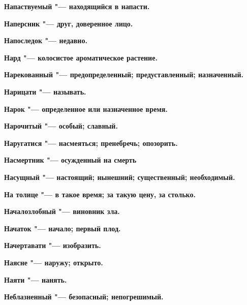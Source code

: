 \begin{mymulticols}{2}
\bfseries Напаствуемый\normalfont{} "--- находящийся в напасти. 




\bfseries Наперсник\normalfont{} "--- друг, доверенное лицо. 




\bfseries Напоследок\normalfont{} "--- недавно. 




\bfseries Нард\normalfont{} "--- колосистое ароматическое растение. 




\bfseries Нарекованный\normalfont{} "--- предопределенный; предуставленный; назначенный. 




\bfseries Нарицати\normalfont{} "--- называть. 




\bfseries Нарок\normalfont{} "--- определенное или назначенное время. 




\bfseries Нарочитый\normalfont{} "--- особый; славный. 




\bfseries Наругатися\normalfont{} "--- насмеяться; пренебречь; опозорить. 




\bfseries Насмертник\normalfont{} "--- осужденный на смерть 




\bfseries Насущный\normalfont{} "--- настоящий; нынешний; существенный; необходимый. 




\bfseries На толице\normalfont{} "--- в такое время; за такую цену, за столько. 




\bfseries Началозлобный\normalfont{} "--- виновник зла. 




\bfseries Начаток\normalfont{} "--- начало; первый плод. 




\bfseries Начертавати\normalfont{} "--- изобразить. 




\bfseries Наясне\normalfont{} "--- наружу; открыто. 




\bfseries Наяти\normalfont{} "--- нанять. 




\bfseries Неблазненный\normalfont{} "--- безопасный; непогрешимый. 





\end{mymulticols}
